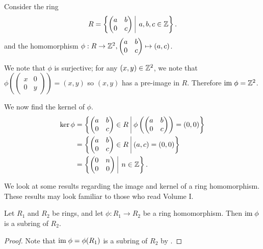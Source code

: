 \begin{example}
    Consider the ring
    \[
        R = \left\{\begin{pmatrix}a&b\\0&c\end{pmatrix}\vert a,b,c\in\Z\right\}.
    \]
    and the homomorphism $\phi: R \to \mathbb{Z}^2, \begin{pmatrix}a&b\\0&c\end{pmatrix} \mapsto (a,c)$.

    We note that $\phi$ is surjective; for any $(x,y)\in\mathbb{Z}^2$, we note that $\phi\left(\begin{pmatrix}x&0\\0&y\end{pmatrix}\right) = (x,y)$ so $(x,y)$ has a pre-image in $R$. Therefore $\mathrm{im}\; \phi = \mathbb{Z}^2$.

    We now find the kernel of $\phi$.
    \begin{align*}
        \ker\phi &= \left\{\begin{pmatrix}a&b\\0&c\end{pmatrix} \in R \vert \phi\left(\begin{pmatrix}a&b\\0&c\end{pmatrix}\right) = (0,0)\right\}\\
        &= \left\{\begin{pmatrix}a&b\\0&c\end{pmatrix} \in R \vert (a,c) = (0,0)\right\}\\
        &= \left\{\begin{pmatrix}0&n\\0&0\end{pmatrix} \vert n \in \Z\right\}.
    \end{align*}
\end{example}

We look at some results regarding the image and kernel of a ring homomorphism. These results may look familiar to those who read Volume I.
\begin{proposition}
    Let $R_1$ and $R_2$ be rings, and let $\phi: R_1 \to R_2$ be a ring homomorphism. Then $\mathrm{im}\;\phi$ is a subring of $R_2$.
\end{proposition}
\begin{proof}
    Note that $\mathrm{im}\;\phi = \phi(R_1)$ is a subring of $R_2$ by .
\end{proof}

